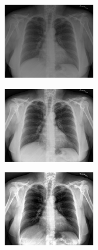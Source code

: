 \documentclass[spanish,twocolumn]{article}
\begin{document}
{\begin{minipage}[b]{1.0\linewidth}
   \begin{minipage}[t]{0.3\linewidth}  
   		\centering
        \includegraphics[width=4cm]{Figures/100_IM-0002-1001.png}
  	\end{minipage}
  \hspace{1pt}
   \begin{minipage}[t]{0.3\linewidth}  
   		\centering
        \includegraphics[width=4cm]{Figures/1182-100_IM-0002-1001.png}
  	\end{minipage}
  \hspace{1pt}
   \begin{minipage}[t]{0.3\linewidth}  
   		\centering
        \includegraphics[width=4cm]{Figures/738-100_IM-0002-1001.png}
  	\end{minipage}
  \vspace{0.5cm}
    \label{fig:resultado1}

\end{minipage}

\begin{minipage}[b]{1.0\linewidth}
  

\end{minipage}}
\end{document}
